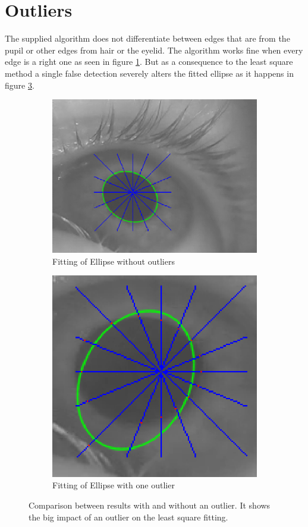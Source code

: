\section{Outliers}
The supplied algorithm does not differentiate between edges that are from the pupil or other edges from hair or the eyelid. The algorithm works fine when every edge is a right one as seen in figure \ref{fig:oldGood}. But as a consequence to the least square method a single false detection severely alters the fitted ellipse as it happens in figure \ref{fig:oldOutlier}. 
\begin{figure}
	\begin{subfigure}{.5\textwidth}
		\centering
		\includegraphics[width=\linewidth]{images/good_fit_old.png}
		\caption{Fitting of Ellipse without outliers}
		\label{fig:oldGood}
	\end{subfigure}%
	\begin{subfigure}{.5\textwidth}
		\centering
		\includegraphics[width=.8\linewidth]{images/outlier_problem.png}
		\caption{Fitting of Ellipse with one outlier}
		\label{fig:oldOutlier}
	\end{subfigure}
\caption{Comparison between results with and without an outlier. It shows the big impact of an outlier on the least square fitting.}

\end{figure}

